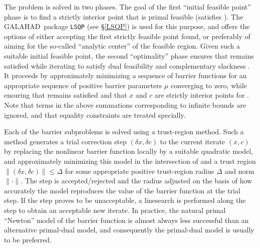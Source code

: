 \documentclass[twoside]{article}
\newcommand{\gal}{{\sf GALAHAD}}
\begin{document}
The problem is solved in two phases. The goal of the first 
``initial feasible point'' phase is
to find a strictly interior point that is primal feasible (satisfies
). The \gal\ package {\tt LSQP} (see \S\ref{LSQP})
is used for this purpose, and offers the options of either accepting the first 
strictly feasible point found, or preferably of aiming for the
so-called ``analytic center'' of the feasible region.
Given such a suitable initial feasible point, the second ``optimality''
phase ensures that  remains satisfied while iterating to
satisfy dual feasibility  and complementary slackness .
It proceeds by approximately minimizing a 
sequence of barrier functions
for an appropriate sequence of positive barrier parameters $\mu$ 
converging to zero,
while ensuring that  remains satisfied and that 
$x$ and $c$ are strictly interior points for . 
Note that terms in the above summations corresponding to infinite bounds are
ignored, and that equality constraints are treated specially.

Each of the barrier subproblems is solved using a trust-region method.
Such a method generates a trial correction step $(\delta x, \delta c)$
to the current iterate $(x, c)$
by replacing the nonlinear barrier function locally by a suitable 
quadratic model, and approximately minimizing this model in the 
intersection of 
and a trust region $\|( \delta x,  \delta c)\| \leq \Delta$
for some appropriate
positive trust-region radius $\Delta$ and norm $\| \cdot \|$.
The step is accepted/rejected
and the radius adjusted on the basis of how accurately the model reproduces the
value of the barrier function at the trial step. If the step proves to be 
unacceptable, a linesearch is performed along the step to obtain an acceptable 
new iterate. In practice, the natural primal ``Newton'' model of the barrier 
function is almost always 
less successful than an alternative primal-dual model, 
and consequently the primal-dual model is usually to be preferred.
\end{document}

